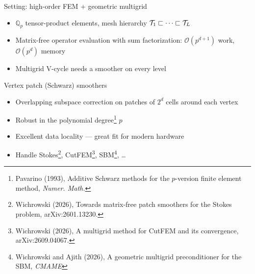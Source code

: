 \documentclass{beamer}
\begin{document}
\begin{frame}{Setting: high-order FEM + geometric multigrid}
    \begin{itemize}
        \item $\mathbb Q_p$ \alert{tensor-product} elements, mesh hierarchy $\mathcal{T}_1 \sqsubset \dots \sqsubset
                  \mathcal{T}_L$
        \item Matrix-free operator evaluation with sum factorization: $\mathcal O(p^{d+1})$ work, $\mathcal O(p^d)$ memory
        \item Multigrid V-cycle needs a \alert{smoother} on every level
    \end{itemize}
    \vfill
    \pause
    \begin{block}{Vertex patch (Schwarz) smoothers}
        \begin{itemize}
            \item Overlapping subspace correction on patches of $2^d$ cells around each vertex
            \item Robust in the polynomial degree\footnote{Pavarino (1993), Additive Schwarz methods for the $p$-version finite element
                      method, \emph{Numer. Math.}} $p$
            \item Excellent data locality --- great fit for modern hardware
            \item Handle Stokes\footnote{Wichrowski (2026), Towards matrix-free patch smoothers for the Stokes problem,
                      arXiv:2601.13230.}, CutFEM\footnote{Wichrowski (2026), A multigrid method for CutFEM and its convergence,
                      arXiv:2609.04067.}, SBM\footnote{Wichrowski and Ajith (2026), A geometric multigrid preconditioner for the SBM,
                      \emph{CMAME} }, \dots
        \end{itemize}
    \end{block}
\end{frame}
\end{document}
